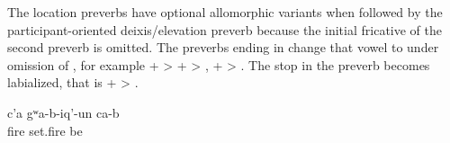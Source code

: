 The location preverbs have optional allomorphic variants when followed by the participant-oriented deixis/elevation preverb  because the initial fricative of the second preverb is omitted. The preverbs ending in  change that vowel to  under omission of , for example  +  >  +  > ,  +  > . The stop in the preverb  becomes labialized, that is  +  >  .
%
\begin{exe}
	\ex	\label{ex:(Somebody) set up verbs}
	\gll	c'a	gʷa-b-iq'-un	ca-b\\
		fire	set.fire	be\\
	\glt	{}
\end{exe}

